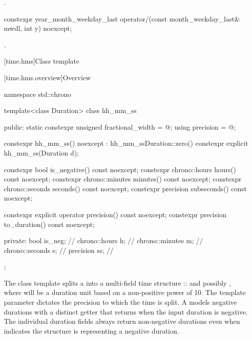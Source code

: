 \begin{itemdescr}
\pnum
\returns
{}.
\end{itemdescr}

\begin{itemdecl}
constexpr year_month_weekday_last
  operator/(const month_weekday_last& mwdl, int y) noexcept;
\end{itemdecl}

\begin{itemdescr}
\pnum
\returns
{}.
\end{itemdescr}


[time.hms]{Class template }

[time.hms.overview]{Overview}

\begin{codeblock}
namespace std::chrono {
  template<class Duration> class hh_mm_ss {
  public:
    static constexpr unsigned fractional_width = @\seebelow@;
    using precision                            = @\seebelow@;

    constexpr hh_mm_ss() noexcept : hh_mm_ss{Duration::zero()} {}
    constexpr explicit hh_mm_ss(Duration d);

    constexpr bool is_negative() const noexcept;
    constexpr chrono::hours hours() const noexcept;
    constexpr chrono::minutes minutes() const noexcept;
    constexpr chrono::seconds seconds() const noexcept;
    constexpr precision subseconds() const noexcept;

    constexpr explicit operator precision() const noexcept;
    constexpr precision to_duration() const noexcept;

  private:
    bool            is_neg;     // \expos
    chrono::hours   h;          // \expos
    chrono::minutes m;          // \expos
    chrono::seconds s;          // \expos
    precision       ss;         // \expos
  };
}
\end{codeblock}

\pnum
The  class template
splits a 
into a multi-field time structure
:: and
possibly ,
where  will be a duration unit
based on a non-positive power of 10.
The  template parameter dictates the precision
to which the time is split.
A  models negative durations
with a distinct  getter
that returns  when the input duration is negative.
The individual duration fields always return non-negative durations
even when  indicates
the structure is representing a negative duration.


